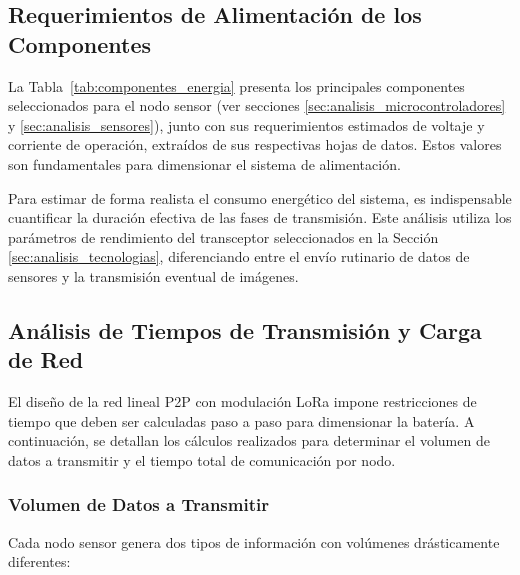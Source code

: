 \subsection{Requerimientos de Alimentación de los Componentes}
\label{subsec:reqs_alimentacion}

La Tabla~\ref{tab:componentes_energia} presenta los principales componentes seleccionados para el nodo sensor (ver secciones \ref{sec:analisis_microcontroladores} y \ref{sec:analisis_sensores}), junto con sus requerimientos estimados de voltaje y corriente de operación, extraídos de sus respectivas hojas de datos. Estos valores son fundamentales para dimensionar el sistema de alimentación.



Para estimar de forma realista el consumo energético del sistema, es indispensable cuantificar la duración efectiva de las fases de transmisión. Este análisis utiliza los parámetros de rendimiento del transceptor seleccionados en la Sección \ref{sec:analisis_tecnologias}, diferenciando entre el envío rutinario de datos de sensores y la transmisión eventual de imágenes.

\subsection{Análisis de Tiempos de Transmisión y Carga de Red}
\label{subsec:analisis_tiempos}
El diseño de la red lineal P2P con modulación LoRa impone restricciones de tiempo que deben ser calculadas paso a paso para dimensionar la batería. A continuación, se detallan los cálculos realizados para determinar el volumen de datos a transmitir y el tiempo total de comunicación por nodo.

\subsubsection*{Volumen de Datos a Transmitir}
\label{ssubsec:volumen_datos}
Cada nodo sensor genera dos tipos de información con volúmenes drásticamente diferentes:

